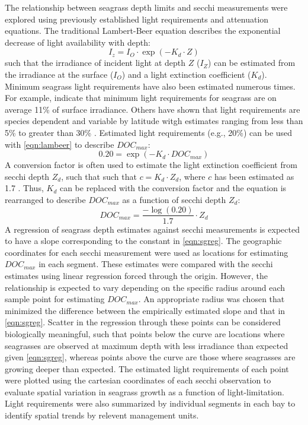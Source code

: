 \documentclass[letterpaper,12pt,oneside]{article}\usepackage[]{graphicx}\usepackage[]{color}
\begin{document}
The relationship between seagrass depth limits and secchi measurements were explored using previously established light requirements and attenuation equations.  The traditional Lambert-Beer equation describes the exponential decrease of light availability with depth:
\begin{equation} \label{eqn:lambeer}
I_{z} = I_{O} \cdot \exp\left(-K_{d} \cdot Z\right)
\end{equation}
\noindent such that the irradiance of incident light at depth $Z$ ($I_{Z}$) can be estimated from the irradiance at the surface ($I_{O}$) and a light extinction coefficient ($K_{d}$). Minimum seagrass light requirements have also been estimated numerous times.  For example, \citet{Duarte91} indicate that minimum light requirements for seagrass are on average 11\% of surface irradiance. Others have shown that light requirements are species dependent and variable by latitude witgh estimates ranging from less than 5\% to greater than 30\% \citep{Dennison93}.  Estimated light requirements (e.g., 20\%) can be used with \cref{eqn:lambeer} to describe $DOC_{max}$:
\begin{equation}
0.20 = \exp\left(-K_{d} \cdot DOC_{max}\right)
\end{equation}
A conversion factor is often used to estimate the light extinction coefficient from secchi depth $Z_{d}$, such that such that $c = K_{d} \cdot Z_{d}$, where $c$ has been estimated as 1.7 \citep{Poole29,Idso74}.  Thus, $K_{d}$ can be replaced with the conversion factor and the equation is rearranged to describe $DOC_{max}$ as a function of secchi depth $Z_{d}$:
\begin{equation} \label{eqn:sgreg}
DOC_{max} = \frac{-\log\left(0.20\right)}{1.7} \cdot Z_{d}
\end{equation}
\noindent A regression of seagrass depth estimates against secchi measurements is expected to have a slope corresponding to the constant in \cref{eqn:sgreg}.  The geographic coordinates for each secchi measurement were used as locations for estimating $DOC_{max}$ in each segment.  These estimates were compared with the secchi estimates using linear regression forced through the origin.  However, the relationship is expected to vary depending on the specific radius around each sample point for estimating $DOC_{max}$.  An appropriate radius was chosen that minimized the difference between the empirically estimated slope and that in \cref{eqn:sgreg}.  Scatter in the regression through these points can be considered biologically meaningful, such that points below the curve are locations where seagrasses are observed at maximum depth with less irradiance than expected given \cref{eqn:sgreg}, whereas points above the curve are those where seagrasses are growing deeper than expected. The estimated light requirements of each point were plotted using the cartesian coordinates of each secchi observation to evaluate spatial variation in seagrass growth as a function of light-limitation.  Light requirements were also summarized by individual segments in each bay to identify spatial trends by relevent management units.  
\end{document}

